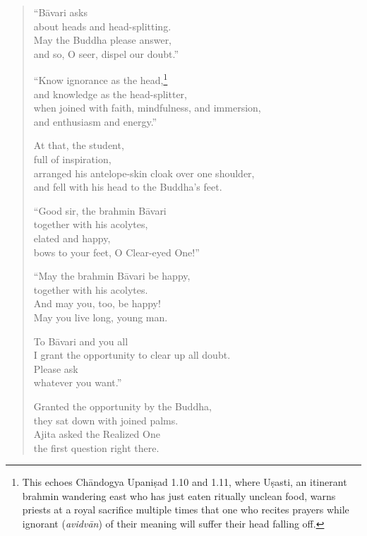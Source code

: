 \documentclass[12pt,openany]{book}%
\begin{document}
\begin{verse}
“\textsanskrit{Bāvari} asks \\
about heads and head-splitting. \\
May the Buddha please answer, \\
and so, O seer, dispel our doubt.” 

“Know ignorance as the head,\footnote{This echoes \textsanskrit{Chāndogya} \textsanskrit{Upaniṣad} 1.10 and 1.11, where \textsanskrit{Uṣasti}, an itinerant brahmin wandering east who has just eaten ritually unclean food, warns priests at a royal sacrifice multiple times that one who recites prayers while ignorant (\textit{\textsanskrit{avidvān}}) of their meaning will suffer their head falling off. } \\
and knowledge as the head-splitter, \\
when joined with faith, mindfulness, and immersion, \\
and enthusiasm and energy.” 

At that, the student, \\
full of inspiration, \\
arranged his antelope-skin cloak over one shoulder, \\
and fell with his head to the Buddha’s feet. 

“Good sir, the brahmin \textsanskrit{Bāvari} \\
together with his acolytes, \\
elated and happy, \\
bows to your feet, O Clear-eyed One!” 

“May the brahmin \textsanskrit{Bāvari} be happy, \\
together with his acolytes. \\
And may you, too, be happy! \\
May you live long, young man. 

To \textsanskrit{Bāvari} and you all \\
I grant the opportunity to clear up all doubt. \\
Please ask \\
whatever you want.” 

Granted the opportunity by the Buddha, \\
they sat down with joined palms. \\
Ajita asked the Realized One \\
the first question right there. 

%
\end{verse}
\end{document}
